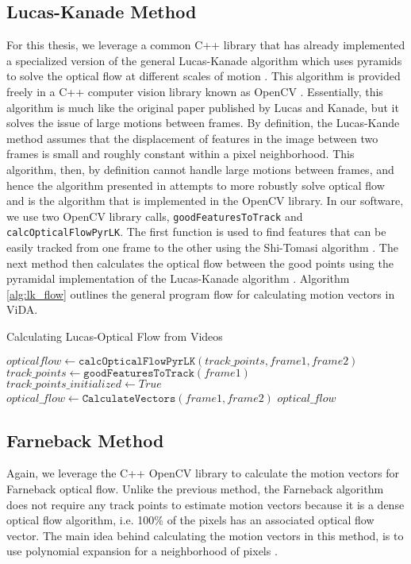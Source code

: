 \subsection{\label{subsection:lucas_kanade} Lucas-Kanade Method} For this
thesis, we leverage a common C++ library that has already implemented a
specialized version of the general Lucas-Kanade algorithm which uses pyramids to
solve the optical flow at different scales of motion
\cite{bouguet2001pyramidal}. This algorithm is provided freely in a C++ computer
vision library known as OpenCV \cite{itseez2015opencv}. Essentially, this
algorithm is much like the original paper published by Lucas and Kanade, but it
solves the issue of large motions between frames. By definition, the Lucas-Kande
method assumes that the displacement of features in the image between two frames
is small and roughly constant within a pixel neighborhood. This algorithm, then,
by definition cannot handle large motions between frames, and hence the algorithm
presented in \cite{bouguet2001pyramidal} attempts to more robustly solve
optical flow and is the algorithm that is implemented in the OpenCV \cite{itseez2015opencv}
library. In our software, we use two OpenCV library calls, \texttt{goodFeaturesToTrack}
and \texttt{calcOpticalFlowPyrLK}. The first function is used to find features
that can be easily tracked from one frame to the other using the Shi-Tomasi
algorithm \cite{shi1994good}. The next method then calculates the optical flow
between the good points using the pyramidal implementation of the Lucas-Kanade
algorithm \cite{bouguet2001pyramidal}. Algorithm \ref{alg:lk_flow} outlines the general
program flow for calculating motion vectors in ViDA.

\begin{algorithm}
\caption{Calculating Lucas-Optical Flow from Videos}
\label{alg:lk_flow}
\begin{algorithmic}[1]
  	\State $opticalflow \gets \texttt{calcOpticalFlowPyrLK}(track\_points, frame1, frame2)$
  \Else
  	\State $track\_points \gets \texttt{goodFeaturesToTrack}(frame1)$
	\State $track\_points\_initialized \gets True$
	\State $optical\_flow \gets  \texttt{CalculateVectors}(frame1, frame2)$
  \EndIf
  \Return $optical\_flow$
\EndProcedure
\end{algorithmic}
\end{algorithm}

\subsection{\label{subsection:farneback_method} Farneback Method}
Again, we leverage the C++ OpenCV library to calculate the motion vectors for
Farneback optical flow. Unlike the previous method, the Farneback algorithm does not require
any track points to estimate motion vectors because it is a dense optical flow
algorithm, i.e. 100\% of the pixels has an associated optical flow vector. The
main idea behind calculating the motion vectors in this method, is to use
polynomial expansion for a neighborhood of pixels \cite{farneback2003two}. 


